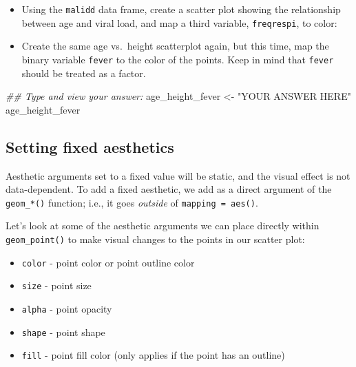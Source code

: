\documentclass[
  letterpaper,
  DIV=11,
  numbers=noendperiod]{scrreprt}
\newenvironment{Shaded}{\begin{snugshade}}{\end{snugshade}}
\newcommand{\DocumentationTok}[1]{\textcolor[rgb]{0.37,0.37,0.37}{\textit{#1}}}
\newcommand{\NormalTok}[1]{\textcolor[rgb]{0.00,0.23,0.31}{#1}}
\newcommand{\OtherTok}[1]{\textcolor[rgb]{0.00,0.23,0.31}{#1}}
\newcommand{\StringTok}[1]{\textcolor[rgb]{0.13,0.47,0.30}{#1}}
\begin{document}
\begin{tcolorbox}[enhanced jigsaw, colframe=quarto-callout-tip-color-frame, colbacktitle=quarto-callout-tip-color!10!white, titlerule=0mm, opacitybacktitle=0.6, breakable, toprule=.15mm, arc=.35mm, rightrule=.15mm, colback=white, bottomrule=.15mm, opacityback=0, toptitle=1mm, left=2mm, bottomtitle=1mm, title=\textcolor{quarto-callout-tip-color}{\faLightbulb}\hspace{0.5em}{Practice}, leftrule=.75mm, coltitle=black]

\begin{itemize}
\item
  Using the \texttt{malidd} data frame, create a scatter plot showing
  the relationship between age and viral load, and map a third variable,
  \texttt{freqrespi}, to color:
\item
  Create the same age vs.~height scatterplot again, but this time, map
  the binary variable \texttt{fever} to the color of the points. Keep in
  mind that \texttt{fever} should be treated as a factor.
\end{itemize}

\begin{Shaded}
\begin{Highlighting}[]
\DocumentationTok{\#\# Type and view your answer:}
\NormalTok{age\_height\_fever }\OtherTok{\textless{}{-}}  \StringTok{"YOUR ANSWER HERE"}
\NormalTok{age\_height\_fever}
\end{Highlighting}
\end{Shaded}

\end{tcolorbox}

\hypertarget{setting-fixed-aesthetics}{%
\subsection{Setting fixed aesthetics}\label{setting-fixed-aesthetics}}

Aesthetic arguments set to a fixed value will be static, and the visual
effect is not data-dependent. To add a fixed aesthetic, we add as a
direct argument of the \texttt{geom\_*()} function; i.e., it goes
\emph{outside} of \texttt{mapping\ =\ aes()}.

Let's look at some of the aesthetic arguments we can place directly
within \texttt{geom\_point()} to make visual changes to the points in
our scatter plot:

\begin{itemize}
\item
  \texttt{color} - point color or point outline color
\item
  \texttt{size} - point size
\item
  \texttt{alpha} - point opacity
\item
  \texttt{shape} - point shape
\item
  \texttt{fill} - point fill color (only applies if the point has an
  outline)
\end{itemize}
\end{document}
